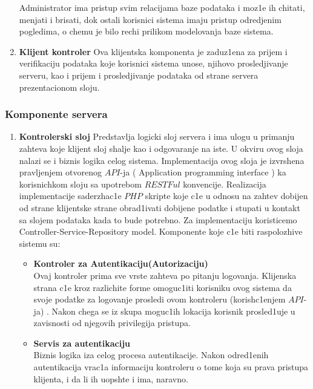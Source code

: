 \begin{enumerate}
\begin{itemize}
\end{itemize}

Administrator ima pristup svim relacijama baze podataka i moz1e ih chitati, menjati i brisati, dok ostali korisnici sistema imaju pristup odredjenim pogledima, o chemu je bilo rechi prilikom modelovanja baze sistema.
 \item \textbf{Klijent kontroler}
 Ova klijentska komponenta je zaduz1ena za prijem i verifikaciju podataka koje korisnici sistema unose, njihovo prosledjivanje serveru, kao i prijem i prosledjivanje podataka od strane servera prezentacionom sloju. 
\end{enumerate}
\subsubsection{Komponente servera}
\begin{enumerate}
    \item {\textbf{Kontrolerski sloj}}
			Predstavlja logicki sloj servera i ima ulogu u primanju zahteva koje klijent sloj shalje kao i odgovaranje na iste. U okviru ovog sloja nalazi se i biznis logika celog sistema.  Implementacija ovog sloja je izvrshena pravljenjem otvorenog $API$-ja ( \selectfont Application programming interface  \selectfont ) ka korisnichkom sloju sa upotrebom $RESTFul$ konvencije. Realizacija implementacije saderzhac1e $PHP$ skripte koje c1e u odnosu na zahtev dobijen od strane klijentske strane obrad1ivati dobijene podatke i stupati u kontakt sa slojem podataka kada to bude potrebno. Za implementaciju koristicemo  \selectfont Controller-Service-Repository \selectfont  model.  Komponente koje c1e biti raspolozhive sistemu su:
			\begin{itemize}
				\item {\textbf{Kontroler za Autentikaciju(Autorizaciju)} \\
						Ovaj kontroler prima sve vrste zahteva po pitanju logovanja. Klijenska strana c1e kroz razlichite forme omoguc1iti korisniku ovog sistema da svoje podatke za logovanje prosledi ovom kontroleru (korish\-c1enjem $API$-ja) . Nakon chega se iz skupa moguc1ih lokacija korisnik prosled1uje u zavisnosti od njegovih privilegija pristupa.}
				\item{\textbf{Servis za autentikaciju}\\
				Biznis logika iza celog procesa autentikacije. Nakon odred1enih autentikacija vrac1a informaciju kontroleru o tome koja su prava pristupa klijenta, i da li ih uopshte i ima, naravno.}

\end{itemize}
\end{enumerate}
